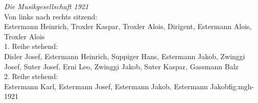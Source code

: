 \begin{figure}[ht]
    \hfil
\end{figure}

\clearpage

{ \emph{Die Musikgesellschaft 1921}\\
    Von links nach rechts sitzend:\\
    Estermann Heinrich, Troxler Kaspar, Troxler Alois, Dirigent, Estermann Alois,
    Troxler Alois\\
    1. Reihe stehend:\\
    Disler Josef, Estermann Heinrich, Suppiger Hans, Estermann Jakob, Zwinggi
    Josef, Suter Josef, Erni Leo, Zwinggi Jakob, Suter Kaspar, Gassmann Balz\\
    2. Reihe stehend:\\
    Estermann Karl, Estermann Josef, Estermann Jakob, Estermann
    Jakob}{fig:mgh-1921}

